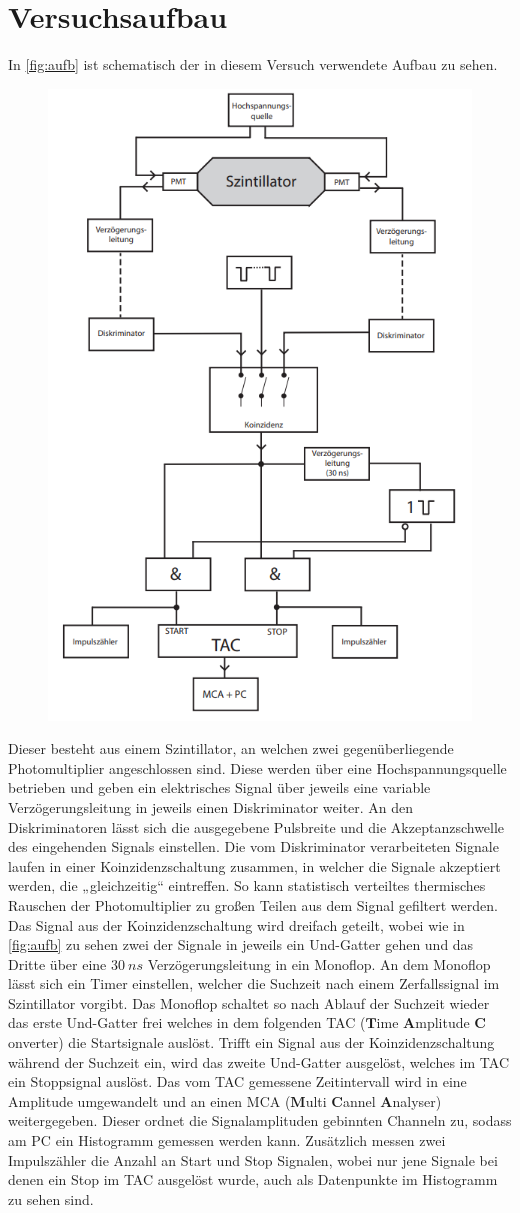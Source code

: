 \section{Versuchsaufbau}
\label{sec:aufbau}
In \autoref{fig:aufb} ist schematisch der in diesem Versuch verwendete Aufbau zu sehen.
\begin{figure}[H]
    \centering
    \includegraphics[width=0.5\linewidth]{data/aufbau_schem.png}
    \label{fig:aufb}
\end{figure}
\noindent
Dieser besteht aus einem Szintillator, an welchen zwei gegenüberliegende Photomultiplier angeschlossen sind. Diese werden über eine Hochspannungsquelle betrieben und geben ein 
elektrisches Signal über jeweils eine variable Verzögerungsleitung in jeweils einen Diskriminator weiter. An den Diskriminatoren lässt sich die ausgegebene Pulsbreite und die Akzeptanzschwelle des eingehenden Signals einstellen.
Die vom Diskriminator verarbeiteten Signale laufen in einer Koinzidenzschaltung zusammen, in welcher die Signale akzeptiert werden, die „gleichzeitig“ eintreffen. So kann statistisch verteiltes thermisches Rauschen der Photomultiplier zu großen Teilen aus dem Signal gefiltert werden. Das Signal aus der Koinzidenzschaltung wird dreifach geteilt, wobei wie in \autoref{fig:aufb} zu sehen zwei der Signale in jeweils 
ein Und-Gatter gehen und das Dritte über eine $\SI{30}{ns}$ Verzögerungsleitung in ein Monoflop. An dem Monoflop lässt sich ein Timer einstellen, welcher die Suchzeit nach einem Zerfallssignal im Szintillator vorgibt. Das Monoflop schaltet so nach Ablauf der Suchzeit wieder das erste Und-Gatter frei welches in dem folgenden TAC ($\textbf{T}$ime $\textbf{A}$mplitude $\textbf{C}$onverter)
die Startsignale auslöst. Trifft ein Signal aus der Koinzidenzschaltung während der Suchzeit ein, wird das zweite Und-Gatter ausgelöst, welches im TAC ein Stoppsignal auslöst. Das vom TAC gemessene Zeitintervall wird in eine Amplitude umgewandelt und an einen MCA ($\textbf{M}$ulti $\textbf{C}$annel $\textbf{A}$nalyser) weitergegeben. Dieser ordnet die Signalamplituden gebinnten Channeln zu, sodass am PC ein Histogramm gemessen werden kann.
Zusätzlich messen zwei Impulszähler die Anzahl an Start und Stop Signalen, wobei nur jene Signale bei denen ein Stop im TAC ausgelöst wurde, auch als Datenpunkte im Histogramm zu sehen sind.
\newpage

